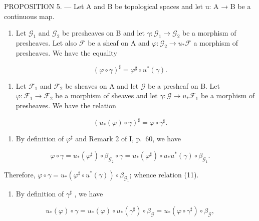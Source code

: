 PROPOSITION 5. — Let A and B be topological spaces and let u: A → B be a continuous map.

\begin{enumerate}
\def\labelenumi{\alph{enumi})}
\tightlist
\item
  Let \(\mathcal{G}_1\) and \(\mathcal{G}_2\) be presheaves on B and let \(\gamma\colon\mathcal{G}_1\to\mathcal{G}_2\) be a morphism of presheaves. Let also \(\mathcal{F}\) be a sheaf on A and \(\varphi\colon\mathcal{G}_2\to u_*\mathcal{F}\) a morphism of presheaves. We have the equality
\end{enumerate}

\[
(\varphi \circ \gamma) ^ {\sharp} = \varphi^ {\sharp} \circ u ^ {*} (\gamma).\tag{11}
\]

\begin{enumerate}
\def\labelenumi{\alph{enumi})}
\setcounter{enumi}{1}
\tightlist
\item
  Let \(\mathcal{F}_1\) and \(\mathcal{F}_2\) be sheaves on A and let \(\mathcal{G}\) be a presheaf on B. Let \(\varphi\colon\mathcal{F}_1\to\mathcal{F}_2\) be a morphism of sheaves and let \(\gamma\colon\mathcal{G}\to u_*\mathcal{F}_1\) be a morphism of presheaves. We have the relation
\end{enumerate}

\[
(u _ {*} (\varphi) \circ \gamma) ^ {\sharp} = \varphi \circ \gamma^ {\sharp}.
\]

\begin{enumerate}
\def\labelenumi{\alph{enumi})}
\tightlist
\item
  By definition of \(\varphi^{\sharp}\) and Remark 2 of I, p.~60, we have
\end{enumerate}

\[
\varphi \circ \gamma = u _ {*} (\varphi^ {\sharp}) \circ \beta_ {\mathcal {G} _ {2}} \circ \gamma = u _ {*} (\varphi^ {\sharp}) \circ u _ {*} u ^ {*} (\gamma) \circ \beta_ {\mathcal {G} _ {1}}.
\]

Therefore, \(\varphi \circ \gamma = u_{*}(\varphi^{\sharp}\circ u^{*}(\gamma))\circ \beta_{\mathcal{G}_{1}}\); whence relation (11).

\begin{enumerate}
\def\labelenumi{\alph{enumi})}
\setcounter{enumi}{1}
\tightlist
\item
  By definition of \(\gamma^{\sharp}\) , we have
\end{enumerate}

\[
u _ {*} (\varphi) \circ \gamma = u _ {*} (\varphi) \circ u _ {*} (\gamma^ {\sharp}) \circ \beta_ {\mathcal {G}} = u _ {*} (\varphi \circ \gamma^ {\sharp}) \circ \beta_ {\mathcal {G}},
\]

